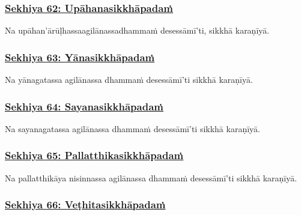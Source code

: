 \subsubsection*{\hyperref[training62]{Sekhiya 62: Upāhanasikkhāpadaṁ}}
\label{sekh62}

Na upāhan'ārūḷhassa\makeatletter\hyperlink{endnote515-appendix}\makeatother \thinspace agilānassa\makeatletter\hyperlink{endnote-appendix}\makeatother \thinspace dhammaṁ desessāmī'ti, sikkhā karaṇīyā.



\subsubsection*{\hyperref[training63]{Sekhiya 63: Yānasikkhāpadaṁ}}
\label{sekh63}

Na yānagatassa agilānassa dhammaṁ desessāmī'ti sikkhā karaṇīyā.



\subsubsection*{\hyperref[training64]{Sekhiya 64: Sayanasikkhāpadaṁ}}
\label{sekh64}

Na sayanagatassa agilānassa dhammaṁ desessāmī'ti sikkhā karaṇīyā.



\subsubsection*{\hyperref[training65]{Sekhiya 65: Pallatthikasikkhāpadaṁ}}
\label{sekh65}

Na pallatthikāya nisinnassa agilānassa dhammaṁ desessāmī'ti sikkhā karaṇīyā.



\subsubsection*{\hyperref[training66]{Sekhiya 66: Veṭhitasikkhāpadaṁ}}
\label{sekh66}

